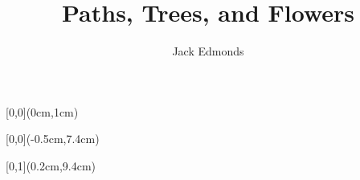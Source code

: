 \documentclass[hyperref={pdfpagelabels=false}]{beamer}
\title{Paths, Trees, and Flowers}
\author{Jack Edmonds}
\institute{ETH Zurich -- Distributed Computing Group -- www.disco.ethz.ch}
\begin{document}
{
\begin{frame}
	\begin{textblock*}{\paperwidth}[0,0](0cm,1cm)
		\begin{center}
			\textbf{\huge \inserttitle}
		\end{center}
	\end{textblock*}
	\begin{textblock*}{\paperwidth}[0,0](-0.5cm,7.4cm)
		\flushright
		\color{white}
		\itshape \insertauthor
	\end{textblock*}
	\begin{textblock*}{\paperwidth}[0,1](0.2cm,9.4cm)
		\flushleft
		\tiny \itshape \insertinstitute
	\end{textblock*}
\end{frame}
}

\frame{\tableofcontents}
\end{document}
